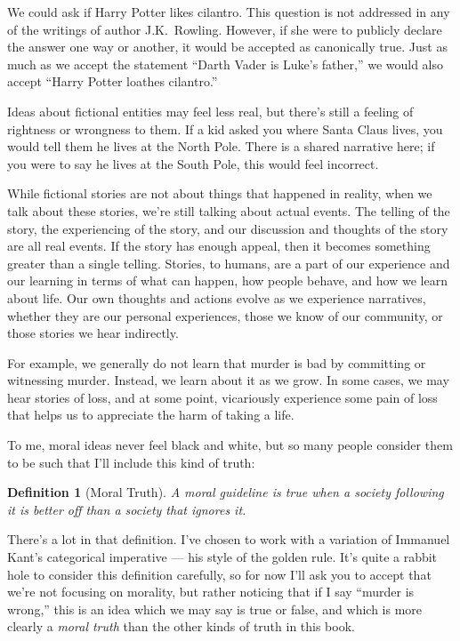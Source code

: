 \documentclass[9pt, twoside]{book}
\newtheorem*{defn}{Definition}
\theoremstyle{argtstyle}
\begin{document}
We could ask if Harry Potter likes cilantro. This question is not addressed in
any of the writings of author J.K.~Rowling. However, if she were to publicly
declare the answer one way or another, it would be accepted as canonically true.
Just as much as we accept the statement ``Darth Vader is Luke's father,'' we
would also accept ``Harry Potter loathes cilantro.''

Ideas about fictional entities may feel less real,
but there's still a feeling of rightness or wrongness to them.
If a kid asked you where Santa Claus lives, you would tell them he
lives at the North Pole. There is a shared narrative here; if you were to say he
lives at the South Pole, this would feel incorrect.

While fictional stories are not about things that happened in reality, when we
talk about these stories, we're still talking about actual events. The telling
of the story,
the experiencing of the story, and our discussion and thoughts of the
story are all real events.
If the story has enough appeal,
then it becomes something greater than a single telling.
Stories,
to humans, are a part of our experience and our learning in terms of what can
happen, how people behave, and how we learn about life. Our own thoughts and
actions evolve as we experience narratives, whether they are our personal
experiences, those we know of our community, or those stories we hear
indirectly.

For example, we generally do not learn that murder is bad by committing or
witnessing murder. Instead, we learn about it as we grow. In some cases, we may
hear stories of loss, and at some point, vicariously experience some pain of
loss that helps us to appreciate the harm of taking a life.

To me, moral ideas never feel black and white, but so many people consider them
to be such that I'll include this kind of truth:
\begin{defn}[Moral Truth]
    A moral guideline is true when a society following it is better off than a
    society that ignores it.
\end{defn}

There's a lot in that definition. I've chosen to work with a variation of
Immanuel Kant's categorical imperative --- his style of the golden rule. It's
quite a rabbit hole to consider this definition carefully, so for now I'll ask
you to accept that we're not focusing on morality, but rather noticing that if I
say ``murder is wrong,'' this is an idea which we may say is true or false, and
which is more clearly a {\em moral truth} than the other kinds of truth in this
book.
\end{document}
